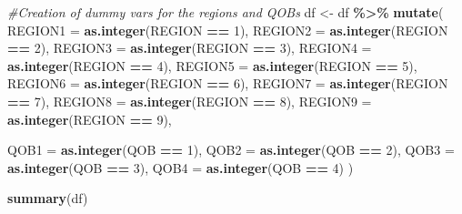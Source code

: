 \documentclass[
]{article}
\newenvironment{Shaded}{\begin{snugshade}}{\end{snugshade}}
\newcommand{\AttributeTok}[1]{\textcolor[rgb]{0.13,0.29,0.53}{#1}}
\newcommand{\CommentTok}[1]{\textcolor[rgb]{0.56,0.35,0.01}{\textit{#1}}}
\newcommand{\DecValTok}[1]{\textcolor[rgb]{0.00,0.00,0.81}{#1}}
\newcommand{\FunctionTok}[1]{\textcolor[rgb]{0.13,0.29,0.53}{\textbf{#1}}}
\newcommand{\NormalTok}[1]{#1}
\newcommand{\OtherTok}[1]{\textcolor[rgb]{0.56,0.35,0.01}{#1}}
\newcommand{\SpecialCharTok}[1]{\textcolor[rgb]{0.81,0.36,0.00}{\textbf{#1}}}
\begin{document}
\begin{Shaded}
\begin{Highlighting}[]
\CommentTok{\#Creation of dummy vars for the regions and QOBs}
\NormalTok{df }\OtherTok{\textless{}{-}}\NormalTok{ df }\SpecialCharTok{\%\textgreater{}\%}
  \FunctionTok{mutate}\NormalTok{(}
    \AttributeTok{REGION1 =} \FunctionTok{as.integer}\NormalTok{(REGION }\SpecialCharTok{==} \DecValTok{1}\NormalTok{),}
    \AttributeTok{REGION2 =} \FunctionTok{as.integer}\NormalTok{(REGION }\SpecialCharTok{==} \DecValTok{2}\NormalTok{),}
    \AttributeTok{REGION3 =} \FunctionTok{as.integer}\NormalTok{(REGION }\SpecialCharTok{==} \DecValTok{3}\NormalTok{),}
    \AttributeTok{REGION4 =} \FunctionTok{as.integer}\NormalTok{(REGION }\SpecialCharTok{==} \DecValTok{4}\NormalTok{),}
    \AttributeTok{REGION5 =} \FunctionTok{as.integer}\NormalTok{(REGION }\SpecialCharTok{==} \DecValTok{5}\NormalTok{),}
    \AttributeTok{REGION6 =} \FunctionTok{as.integer}\NormalTok{(REGION }\SpecialCharTok{==} \DecValTok{6}\NormalTok{),}
    \AttributeTok{REGION7 =} \FunctionTok{as.integer}\NormalTok{(REGION }\SpecialCharTok{==} \DecValTok{7}\NormalTok{),}
    \AttributeTok{REGION8 =} \FunctionTok{as.integer}\NormalTok{(REGION }\SpecialCharTok{==} \DecValTok{8}\NormalTok{),}
    \AttributeTok{REGION9 =} \FunctionTok{as.integer}\NormalTok{(REGION }\SpecialCharTok{==} \DecValTok{9}\NormalTok{),}

    \AttributeTok{QOB1 =} \FunctionTok{as.integer}\NormalTok{(QOB }\SpecialCharTok{==} \DecValTok{1}\NormalTok{),}
    \AttributeTok{QOB2 =} \FunctionTok{as.integer}\NormalTok{(QOB }\SpecialCharTok{==} \DecValTok{2}\NormalTok{),}
    \AttributeTok{QOB3 =} \FunctionTok{as.integer}\NormalTok{(QOB }\SpecialCharTok{==} \DecValTok{3}\NormalTok{),}
    \AttributeTok{QOB4 =} \FunctionTok{as.integer}\NormalTok{(QOB }\SpecialCharTok{==} \DecValTok{4}\NormalTok{)}
\NormalTok{  )}
\end{Highlighting}
\end{Shaded}

\begin{Shaded}
\begin{Highlighting}[]
\FunctionTok{summary}\NormalTok{(df)}
\end{Highlighting}
\end{Shaded}
\end{document}
